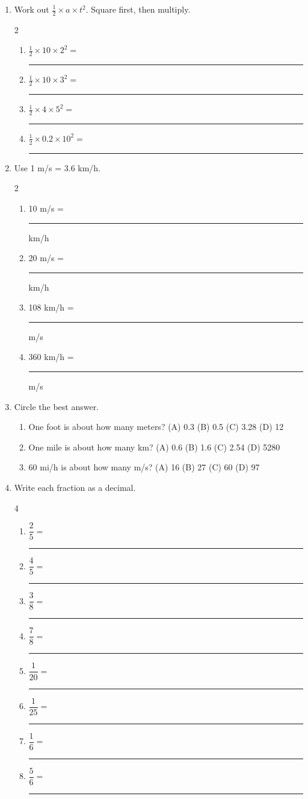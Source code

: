 \documentclass[12pt, twoside]{article}
\newcommand{\blank}[1][2.4cm]{\rule{#1}{0.4pt}}
\begin{document}
\begin{enumerate}[itemsep=0.4cm]
\item Work out $\frac{1}{2} \times a \times t^2$. Square first, then multiply.
  \begin{multicols}{2}
    \begin{enumerate}[itemsep=0.5cm]
      \item $\frac{1}{2} \times 10 \times 2^2 = $ \blank[1.8cm]
      \item $\frac{1}{2} \times 10 \times 3^2 = $ \blank[1.8cm]
      \item $\frac{1}{2} \times 4 \times 5^2 = $ \blank[1.8cm]
      \item $\frac{1}{2} \times 0.2 \times 10^2 = $ \blank[1.8cm]
    \end{enumerate}
  \end{multicols}

\item Use 1 m/s = 3.6 km/h.
  \begin{multicols}{2}
    \begin{enumerate}[itemsep=0.5cm]
      \item 10 m/s = \blank[1.8cm] km/h
      \item 20 m/s = \blank[1.8cm] km/h
      \item 108 km/h = \blank[1.8cm] m/s
      \item 360 km/h = \blank[1.8cm] m/s
    \end{enumerate}
  \end{multicols}

\item Circle the best answer.
  \begin{enumerate}[itemsep=0.5cm]
    \item One foot is about how many meters? \hfill
      (A) 0.3 \quad\; (B) 0.5 \quad\; (C) 3.28 \quad\; (D) 12
    \item One mile is about how many km? \hfill
      (A) 0.6 \quad\; (B) 1.6 \quad\; (C) 2.54 \quad\; (D) 5280
    \item 60 mi/h is about how many m/s? \hfill
      (A) 16 \quad\; (B) 27 \quad\; (C) 60 \quad\; (D) 97
  \end{enumerate}

\newpage

\item Write each fraction as a decimal.
  \begin{multicols}{4}
    \begin{enumerate}[itemsep=0.6cm]
      \item $\dfrac{2}{5} = $ \blank[1.6cm]
      \item $\dfrac{4}{5} = $ \blank[1.6cm]
      \item $\dfrac{3}{8} = $ \blank[1.6cm]
      \item $\dfrac{7}{8} = $ \blank[1.6cm]
      \item $\dfrac{1}{20} = $ \blank[1.6cm]
      \item $\dfrac{1}{25} = $ \blank[1.6cm]
      \item $\dfrac{1}{6} = $ \blank[1.6cm]
      \item $\dfrac{5}{6} = $ \blank[1.6cm]
    \end{enumerate}
  \end{multicols}


\end{enumerate}
\end{document}
